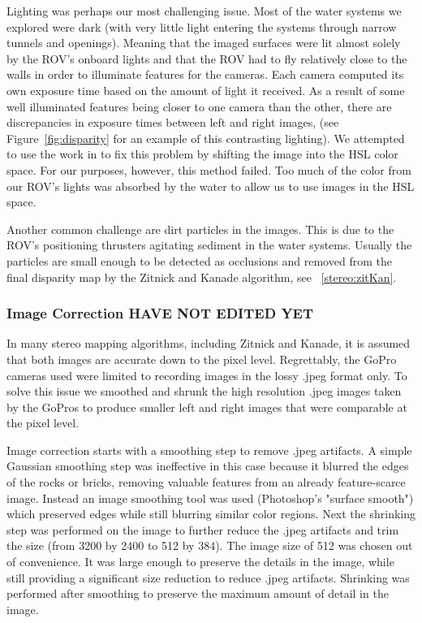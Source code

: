 \documentclass[twocolumn]{article}
\begin{document}
Lighting was perhaps our most challenging issue. 
Most of the water systems we explored were dark (with very little light entering the systems through narrow tunnels and openings).
Meaning that the imaged surfaces were lit almost solely by the ROV's onboard lights and that the ROV had to fly relatively close to the walls in order to illuminate features for the cameras.
Each camera computed its own exposure time based on the amount of light it received.  
As a result of some well illuminated features being closer to one camera than the other, there are discrepancies in exposure times between left and right images, (see Figure~\ref{fig:disparity} for an example of this contrasting lighting).
We attempted to use the work in \cite{stereo:nalGast} to fix this problem by shifting the image into the HSL color space.  For our purposes, however, this method failed.
Too much of the color from our ROV's lights was absorbed by the water to allow us to use images in the HSL space.

Another common challenge are dirt particles in the images.
This is due to the ROV's positioning thrusters agitating sediment in the water systems.
Usually the particles are small enough to be detected as occlusions and removed from the final disparity map by the Zitnick and Kanade algorithm, see ~\ref{stereo:zitKan}.

\subsubsection{Image Correction HAVE NOT EDITED YET}
\label{subsec:image_correction}

In many stereo mapping algorithms, including Zitnick and Kanade, it is assumed that both images are accurate down to the pixel level.
Regrettably, the GoPro cameras used were limited to recording images in the lossy .jpeg format only.
To solve this issue we smoothed and shrunk the high resolution .jpeg images taken by the GoPros to produce smaller left and right images that were comparable at the pixel level.

Image correction starts with a smoothing step  to remove .jpeg artifacts.
  A simple Gaussian smoothing step was ineffective in this case because it blurred the edges of the rocks or bricks, removing valuable features from an already feature-scarce image.
  Instead an image smoothing tool was used (Photoshop's "surface smooth") which preserved edges while still blurring similar color regions.
  Next the shrinking step was performed on the image to further reduce the .jpeg artifacts and trim the size (from 3200 by 2400 to 512 by 384).
The image size of 512 was chosen out of convenience.  It was large enough to preserve the details in the image, while still providing a significant size reduction to reduce .jpeg artifacts.   
Shrinking was performed after smoothing to preserve the maximum amount of detail in the image.
\end{document}
